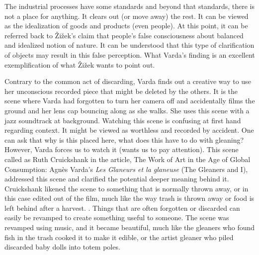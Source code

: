 The industrial processes have some standards and beyond that standards, there is not a place for anything. It clears out (or move away) the rest. It can be viewed as the idealization of goods and products (even people). At this point, it can be referred back to Žižek’s claim that people’s false consciousness about balanced and idealized notion of nature. It can be understood that this type of clarification of objects may result in this false perception. What Varda’s finding is an excellent exemplification of what Žižek wants to point out.

Contrary to the common act of discarding, Varda finds out a creative way to use her unconscious recorded piece that might be deleted by the others. It is the scene where Varda had forgotten to turn her camera off and accidentally films the ground and her lens cap bouncing along as she walks. She uses this scene with a jazz soundtrack at background. Watching this scene is confusing at first hand regarding context. It might be viewed as worthless and recorded by accident. One can ask that why is this placed here, what does this have to do with gleaning? However, Varda forces us to watch it (wants us to pay attention). This scene called as  Ruth Cruickshank in the article, The Work of Art in the Age of Global Consumption: Agnès Varda’s \textit{Les Glaneurs et la glaneuse} (The Gleaners and I), addressed this scene and clarified the potential deeper meaning behind it. Cruickshank likened the scene to something that is normally thrown away, or in this case edited out of the film, much like the way trash is thrown away or food is left behind after a harvest.  \cite{cruickshank2007work}. Things that are often forgotten or discarded can easily be revamped to create something useful to someone. The scene was revamped using music, and it became beautiful, much like the gleaners who found fish in the trash cooked it to make it edible, or the artist gleaner who piled discarded baby dolls into totem poles.

